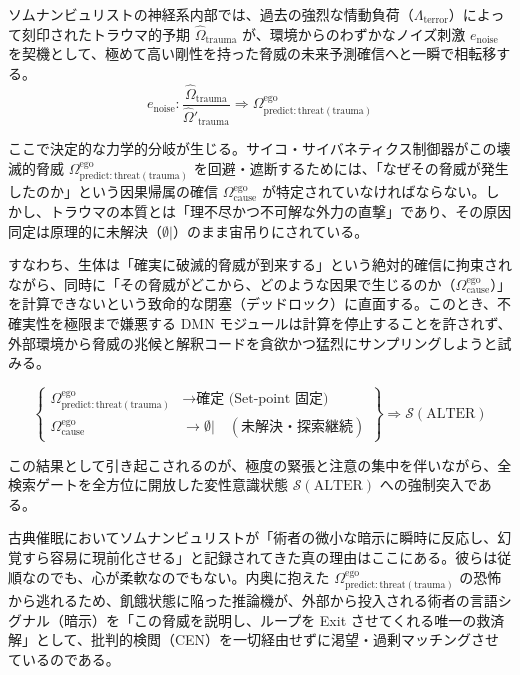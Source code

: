 ソムナンビュリストの神経系内部では、過去の強烈な情動負荷（$\Lambda_{\mathrm{terror}}$）によって刻印されたトラウマ的予期 $\hat{\Omega}_{\mathrm{trauma}}$ が、環境からのわずかなノイズ刺激 $e_{\mathrm{noise}}$ を契機として、極めて高い剛性を持った脅威の未来予測確信へと一瞬で相転移する。
\begin{equation}
e_{\mathrm{noise}} : \frac{\hat{\Omega}_{\mathrm{trauma}}}{\hat{\Omega}'_{\mathrm{trauma}}} \Longrightarrow \Omega^{\mathrm{ego}}_{\mathrm{predict:threat(trauma)}}
\end{equation}

ここで決定的な力学的分岐が生じる。サイコ・サイバネティクス制御器がこの壊滅的脅威 $\Omega^{\mathrm{ego}}_{\mathrm{predict:threat(trauma)}}$ を回避・遮断するためには、「なぜその脅威が発生したのか」という因果帰属の確信 $\Omega^{\mathrm{ego}}_{\mathrm{cause}}$ が特定されていなければならない。しかし、トラウマの本質とは「理不尽かつ不可解な外力の直撃」であり、その原因同定は原理的に未解決（$\emptyset |$）のまま宙吊りにされている。

すなわち、生体は「確実に破滅的脅威が到来する」という絶対的確信に拘束されながら、同時に「その脅威がどこから、どのような因果で生じるのか（$\Omega^{\mathrm{ego}}_{\mathrm{cause}}$）」を計算できないという致命的な閉塞（デッドロック）に直面する。このとき、不確実性を極限まで嫌悪する DMN モジュールは計算を停止することを許されず、外部環境から脅威の兆候と解釈コードを貪欲かつ猛烈にサンプリングしようと試みる。

\begin{equation}
\left\{
\begin{aligned}
\Omega^{\mathrm{ego}}_{\mathrm{predict:threat(trauma)}} & \longrightarrow \text{確定 (Set-point 固定)} \\
\Omega^{\mathrm{ego}}_{\mathrm{cause}} & \longrightarrow \emptyset | \quad (\text{未解決・探索継続})
\end{aligned}
\right\}
\Longrightarrow \mathcal{S}(\mathrm{ALTER})
\end{equation}


この結果として引き起こされるのが、極度の緊張と注意の集中を伴いながら、全検索ゲートを全方位に開放した変性意識状態 $\mathcal{S}(\mathrm{ALTER})$ への強制突入である。

古典催眠においてソムナンビュリストが「術者の微小な暗示に瞬時に反応し、幻覚すら容易に現前化させる」と記録されてきた真の理由はここにある。彼らは従順なのでも、心が柔軟なのでもない。内奥に抱えた $\Omega^{\mathrm{ego}}_{\mathrm{predict:threat(trauma)}}$ の恐怖から逃れるため、飢餓状態に陥った推論機が、外部から投入される術者の言語シグナル（暗示）を「この脅威を説明し、ループを Exit させてくれる唯一の救済解」として、批判的検閲（CEN）を一切経由せずに渇望・過剰マッチングさせているのである。

